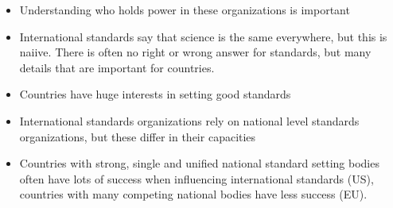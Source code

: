 \documentclass[11pt]{article}
\begin{document}
\begin{itemize}
\item Understanding who holds power in these organizations is important
\item International standards say that science is the same everywhere, but this is
naiive. There is often no right or wrong answer for standards, but many
details that are important for countries.
\item Countries have huge interests in setting good standards
\item International standards organizations rely on national level standards
organizations, but these differ in their capacities
\item Countries with strong, single and unified national standard setting bodies
often have lots of success when influencing international standards (US),
countries with many competing national bodies have less success (EU).
\end{itemize}
\end{document}
